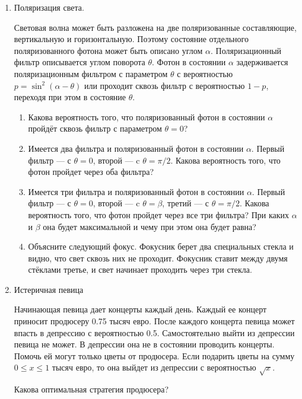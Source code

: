 \documentclass[nobib]{tufte-handout}
\begin{document}
\begin{enumerate}
\item Поляризация света.

Световая волна может быть разложена на две поляризованные составляющие, вертикальную и горизонтальную. Поэтому состояние отдельного поляризованного фотона может быть описано углом $\alpha$. Поляризационный фильтр описывается углом поворота $\theta$. Фотон в состоянии $\alpha$ задерживается поляризационным фильтром с параметром $\theta$ с вероятностью $p=\sin^2(\alpha-\theta)$ или проходит сквозь фильтр с вероятностью $1-p$, переходя при этом в состояние $\theta$. 

\begin{enumerate}
\item Какова вероятность того, что поляризованный фотон в состоянии $\alpha$ пройдёт сквозь фильтр с параметром $\theta=0$?
\item Имеется два фильтра и поляризованный фотон в состоянии $\alpha$. Первый фильтр --- с $\theta=0$, второй --- c $\theta=\pi/2$. Какова вероятность того, что фотон пройдет через оба фильтра?
\item Имеется три фильтра и поляризованный фотон в состоянии $\alpha$. Первый фильтр --- с $\theta=0$, второй --- c $\theta=\beta$, третий --- с $\theta=\pi/2$. Какова вероятность того, что фотон пройдет через все три фильтра? При каких $\alpha$ и $\beta$ она будет максимальной и чему при этом она будет равна?
\item Объясните следующий фокус. Фокусник берет два специальных стекла и видно, что свет сквозь них не проходит. Фокусник ставит между двумя стёклами третье, и свет начинает проходить через три стекла. 
\end{enumerate}


\item Истеричная певица

Начинающая певица дает концерты каждый день. Каждый ее концерт приносит продюсеру 0.75 тысяч евро. После каждого концерта певица может впасть в депрессию с вероятностью 0.5. Самостоятельно выйти из депрессии певица не может. В депрессии она не в состоянии проводить концерты. Помочь ей могут только цветы от продюсера. Если подарить цветы на сумму $0\le x\le 1$ тысяч евро, то она выйдет из депрессии с вероятностью $\sqrt{x}$. 

Какова оптимальная стратегия продюсера? 


\end{enumerate}
\end{document}
